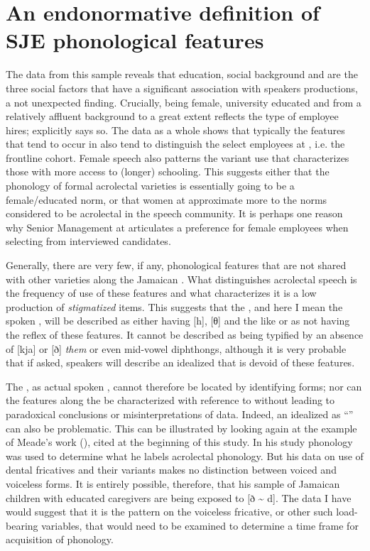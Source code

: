 \section{An endonormative definition of SJE phonological features}\label{sec:5.2}

  The data from this  sample reveals that education, social background and  are the three social factors that have a significant association with speakers productions, a not unexpected finding.  Crucially, being female, university educated and from a relatively affluent background to a great extent reflects the type of employee  hires;  explicitly says so.  The  data as a whole shows that typically the features that tend to occur in  also tend to distinguish the select employees at , i.e. the frontline cohort.  Female speech also patterns the variant use that characterizes those with more access to (longer) schooling.  This suggests either that the phonology of formal acrolectal varieties is essentially going to be a female\slash educated norm, or that women at  approximate more to the norms considered to be acrolectal in the speech community.  It is perhaps one reason why Senior Management at  articulates a preference for female employees when selecting from interviewed candidates.  

Generally, there are very few, if any, phonological features that are not shared with other varieties along the Jamaican .  What distinguishes acrolectal speech is the frequency of use of these features and what characterizes it is a low production of \textit{stigmatized}  items.  This suggests that the , and here I mean the spoken , will be described as either having [h], [θ] and the like or as not having the  reflex of these features.  It cannot be described as being typified by an absence of [kja] or [ð] \textit{them} or even mid-vowel diphthongs, although it is very probable that if asked, speakers will describe an idealized  that is devoid of these features. 

The , as actual spoken , cannot therefore be located by identifying  forms; nor can the features along the  be characterized with reference to  without leading to paradoxical conclusions or misinterpretations of data.  Indeed, an idealized  as “” can also be problematic.  This can be illustrated by looking again at the example of Meade’s work (\citeyear{Meade2001}), cited at the beginning of this study.  In his study  phonology was used to determine what he labels acrolectal phonology.  But his data on use of dental fricatives and their variants makes no distinction between voiced and voiceless forms.  It is entirely possible, therefore, that his sample of Jamaican children with educated caregivers are being exposed to [ð {\textasciitilde} d].  The data I have would suggest that it is the pattern on the voiceless fricative, or other such load-bearing variables, that would need to be examined to determine a time frame for acquisition of  phonology.      

